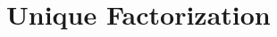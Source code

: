 \documentclass[../I&R.tex]{subfiles}
\begin{document}
\chapter{Unique Factorization}

\subsection*{}
\end{document}
